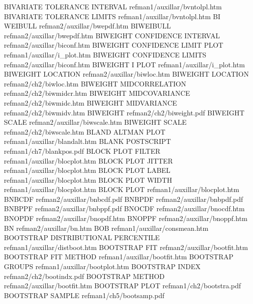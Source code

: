 BIVARIATE TOLERANCE INTERVAL            refman1/auxillar/bvntolpl.htm
BIVARIATE TOLERANCE LIMITS              refman1/auxillar/bvntolpl.htm
BI WEIBULL                              refman2/auxillar/bwepdf.htm
BIWEIBULL                               refman2/auxillar/bwepdf.htm
BIWEIGHT CONFIDENCE INTERVAL            refman2/auxillar/biconf.htm
BIWEIGHT CONFIDENCE LIMIT PLOT          refman1/auxillar/i_plot.htm
BIWEIGHT CONFIDENCE LIMITS              refman2/auxillar/biconf.htm
BIWEIGHT I PLOT                         refman1/auxillar/i_plot.htm
BIWEIGHT LOCATION                       refman2/auxillar/biwloc.htm
BIWEIGHT LOCATION                       refman2/ch2/biwloc.htm
BIWEIGHT MIDCORRELATION                 refman2/ch2/biwmidcr.htm
BIWEIGHT MIDCOVARIANCE                  refman2/ch2/biwmidc.htm
BIWEIGHT MIDVARIANCE                    refman2/ch2/biwmidv.htm
BIWEIGHT                                refman2/ch2/biweight.pdf
BIWEIGHT SCALE                          refman2/auxillar/biwscale.htm
BIWEIGHT SCALE                          refman2/ch2/biwscale.htm
BLAND ALTMAN PLOT                       refman1/auxillar/blandalt.htm
BLANK POSTSCRIPT                        refman1/ch7/blankpos.pdf
BLOCK PLOT FILTER                       refman1/auxillar/blocplot.htm
BLOCK PLOT JITTER                       refman1/auxillar/blocplot.htm
BLOCK PLOT LABEL                        refman1/auxillar/blocplot.htm
BLOCK PLOT WIDTH                        refman1/auxillar/blocplot.htm
BLOCK PLOT                              refman1/auxillar/blocplot.htm
BNBCDF                                  refman2/auxillar/bnbcdf.pdf
BNBPDF                                  refman2/auxillar/bnbpdf.pdf
BNBPPF                                  refman2/auxillar/bnbppf.pdf
BNOCDF                                  refman2/auxillar/bnocdf.htm
BNOPDF                                  refman2/auxillar/bnopdf.htm
BNOPPF                                  refman2/auxillar/bnoppf.htm
BN                                      refman2/auxillar/bn.htm
BOB                                     refman1/auxillar/consmean.htm
BOOTSTRAP DISTRIBUTIONAL PERCENTILE     refman1/auxillar/distboot.htm
BOOTSTRAP FIT                           refman2/auxillar/bootfit.htm
BOOTSTRAP FIT METHOD                    refman1/auxillar/bootfit.htm
BOOTSTRAP GROUPS                        refman1/auxillar/bootplot.htm
BOOTSTRAP INDEX                         refman2/ch2/bootindx.pdf
BOOTSTRAP METHOD                        refman2/auxillar/bootfit.htm
BOOTSTRAP PLOT                          refman1/ch2/bootstra.pdf
BOOTSTRAP SAMPLE                        refman1/ch5/bootsamp.pdf
